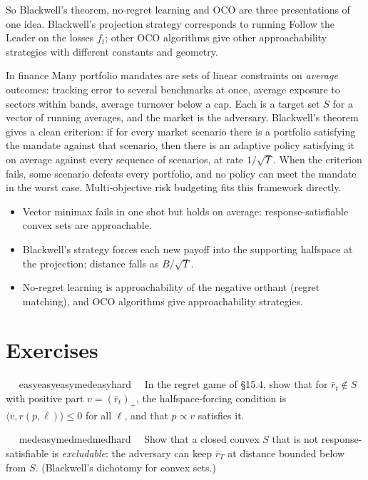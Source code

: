 \documentclass[11pt,a4paper,openany]{book}
\newcommand{\ip}[2]{\langle #1,#2\rangle}
\newcommand{\extag}[2]{%
  \def\tmp{#1}\def\tmpE{easy}\def\tmpM{med}\def\tmpH{hard}%
  \ifx\tmp\tmpE\def\tagc{defc}\else\ifx\tmp\tmpM\def\tagc{thmc}\else\ifx\tmp\tmpH\def\tagc{warnc}\else\def\tagc{finc}\fi\fi\fi
  \tcbox[on line,boxrule=0pt,arc=2pt,colback=\tagc!12,left=2pt,right=2pt,top=0pt,bottom=0pt,boxsep=1pt]{\sffamily\scriptsize\bfseries\color{\tagc}#2}}
\newcommand{\exercise}[3]{\par\medskip\noindent\textbf{\sffamily #1}\ \ #2\ \ #3\par}
\begin{document}
So Blackwell's theorem, no-regret learning and OCO are three presentations of one idea. Blackwell's projection strategy corresponds to running Follow the Leader on the losses $f_t$; other OCO algorithms give other approachability strategies with different constants and geometry.

\begin{bfin}{In finance}
Many portfolio mandates are sets of linear constraints on \emph{average} outcomes: tracking error to several benchmarks at once, average exposure to sectors within bands, average turnover below a cap. Each is a target set $S$ for a vector of running averages, and the market is the adversary. Blackwell's theorem gives a clean criterion: if for every market scenario there is a portfolio satisfying the mandate against that scenario, then there is an adaptive policy satisfying it on average against every sequence of scenarios, at rate $1/\sqrt T$. When the criterion fails, some scenario defeats every portfolio, and no policy can meet the mandate in the worst case. Multi-objective risk budgeting fits this framework directly.
\end{bfin}

\begin{takeaways}
\begin{itemize}
\item Vector minimax fails in one shot but holds on average: response-satisfiable convex sets are approachable.
\item Blackwell's strategy forces each new payoff into the supporting halfspace at the projection; distance falls as $B/\sqrt T$.
\item No-regret learning is approachability of the negative orthant (regret matching), and OCO algorithms give approachability strategies.
\end{itemize}
\end{takeaways}

\section*{Exercises}\label{ch15-ex}

\exercise{15.1}{\extag{easy}{warm-up}}{\hypertarget{sol-15.1}{}In the regret game of §15.4, show that for $\bar r_t\notin S$ with positive part $v=(\bar r_t)_+$, the halfspace-forcing condition is $\ip{v}{r(p,\ell)}\le0$ for all $\ell$, and that $p\propto v$ satisfies it.}

\exercise{15.2}{\extag{med}{core}}{\hypertarget{sol-15.2}{}Show that a closed convex $S$ that is not response-satisfiable is \emph{excludable}: the adversary can keep $\bar r_T$ at distance bounded below from $S$. (Blackwell's dichotomy for convex sets.)}
\end{document}
